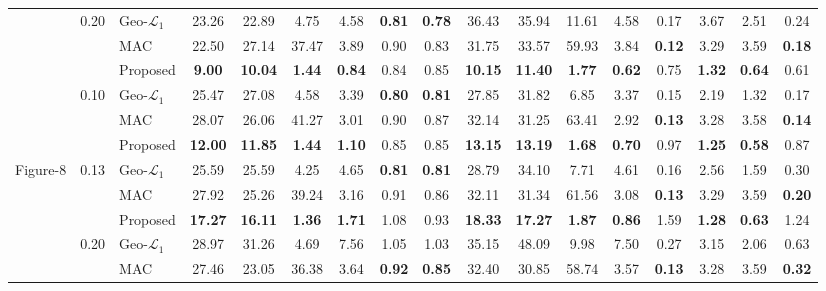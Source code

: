 \begin{table}[htbp]
\begin{threeparttable}
\begin{tabular}{c c l c c c c c c c c c c c c c c}
 & 0.20 & Geo-$\mathcal{L}_1$~\cite{cai2025experiment} & 23.26 & 22.89 & 4.75 & 4.58 & \textbf{0.81} & \textbf{0.78} & 36.43 & 35.94 & 11.61 & 4.58 & 0.17 & 3.67 & 2.51 & 0.24 \\
 &  & MAC~\cite{yadav2024modular} & 22.50 & 27.14 & 37.47 & 3.89 & 0.90 & 0.83 & 31.75 & 33.57 & 59.93 & 3.84 & \textbf{0.12} & 3.29 & 3.59 & \textbf{0.18} \\
\addlinespace[0.8em]
 &  & Proposed & \textbf{9.00} & \textbf{10.04} & \textbf{1.44} & \textbf{0.84} & 0.84 & 0.85 & \textbf{10.15} & \textbf{11.40} & \textbf{1.77} & \textbf{0.62} & 0.75 & \textbf{1.32} & \textbf{0.64} & 0.61 \\
 & 0.10 & Geo-$\mathcal{L}_1$~\cite{cai2025experiment} & 25.47 & 27.08 & 4.58 & 3.39 & \textbf{0.80} & \textbf{0.81} & 27.85 & 31.82 & 6.85 & 3.37 & 0.15 & 2.19 & 1.32 & 0.17 \\
 &  & MAC~\cite{yadav2024modular} & 28.07 & 26.06 & 41.27 & 3.01 & 0.90 & 0.87 & 32.14 & 31.25 & 63.41 & 2.92 & \textbf{0.13} & 3.28 & 3.58 & \textbf{0.14} \\
\addlinespace
 &  & Proposed & \textbf{12.00} & \textbf{11.85} & \textbf{1.44} & \textbf{1.10} & 0.85 & 0.85 & \textbf{13.15} & \textbf{13.19} & \textbf{1.68} & \textbf{0.70} & 0.97 & \textbf{1.25} & \textbf{0.58} & 0.87 \\
Figure-8 & 0.13 & Geo-$\mathcal{L}_1$~\cite{cai2025experiment} & 25.59 & 25.59 & 4.25 & 4.65 & \textbf{0.81} & \textbf{0.81} & 28.79 & 34.10 & 7.71 & 4.61 & 0.16 & 2.56 & 1.59 & 0.30 \\
 &  & MAC~\cite{yadav2024modular} & 27.92 & 25.26 & 39.24 & 3.16 & 0.91 & 0.86 & 32.11 & 31.34 & 61.56 & 3.08 & \textbf{0.13} & 3.29 & 3.59 & \textbf{0.20} \\
\addlinespace
 &  & Proposed & \textbf{17.27} & \textbf{16.11} & \textbf{1.36} & \textbf{1.71} & 1.08 & 0.93 & \textbf{18.33} & \textbf{17.27} & \textbf{1.87} & \textbf{0.86} & 1.59 & \textbf{1.28} & \textbf{0.63} & 1.24 \\
 & 0.20 & Geo-$\mathcal{L}_1$~\cite{cai2025experiment} & 28.97 & 31.26 & 4.69 & 7.56 & 1.05 & 1.03 & 35.15 & 48.09 & 9.98 & 7.50 & 0.27 & 3.15 & 2.06 & 0.63 \\
 &  & MAC~\cite{yadav2024modular} & 27.46 & 23.05 & 36.38 & 3.64 & \textbf{0.92} & \textbf{0.85} & 32.40 & 30.85 & 58.74 & 3.57 & \textbf{0.13} & 3.28 & 3.59 & \textbf{0.32} \\
\bottomrule
\end{tabular}
\begin{tablenotes}

\end{tablenotes}
\end{threeparttable}
\end{table}
